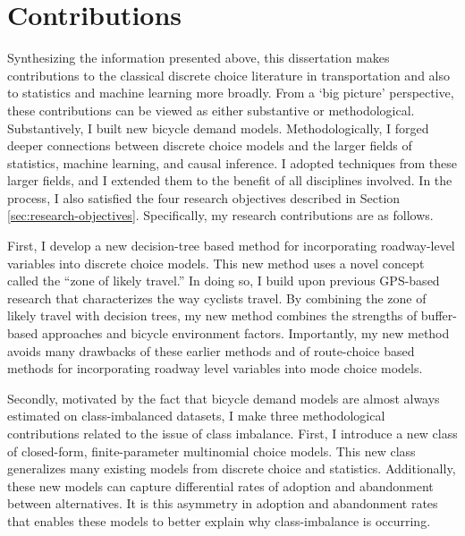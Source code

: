 \section{Contributions}
\label{sec:intro-contributions}
Synthesizing the information presented above, this dissertation makes contributions to the classical discrete choice literature in transportation and also to statistics and machine learning more broadly. From a `big picture' perspective, these contributions can be viewed as either substantive or methodological. Substantively, I built new bicycle demand models. Methodologically, I forged deeper connections between discrete choice models and the larger fields of statistics, machine learning, and causal inference. I adopted techniques from these larger fields, and I extended them to the benefit of all disciplines involved. In the process, I also satisfied the four research objectives described in Section \ref{sec:research-objectives}. Specifically, my research contributions are as follows.

First, I develop a new decision-tree based method for incorporating roadway-level variables into discrete choice models. This new method uses a novel concept called the ``zone of likely travel.'' In doing so, I build upon previous GPS-based research that characterizes the way cyclists travel. By combining the zone of likely travel with decision trees, my new method combines the strengths of buffer-based approaches and bicycle environment factors. Importantly, my new method avoids many drawbacks of these earlier methods and of route-choice based methods for incorporating roadway level variables into mode choice models.

Secondly, motivated by the fact that bicycle demand models are almost always estimated on class-imbalanced datasets, I make three methodological contributions related to the issue of class imbalance. First, I introduce a new class of closed-form, finite-parameter multinomial choice models. This new class generalizes many existing models from discrete choice and statistics. Additionally, these new models can capture differential rates of adoption and abandonment between alternatives. It is this asymmetry in adoption and abandonment rates that enables these models to better explain why class-imbalance is occurring.

